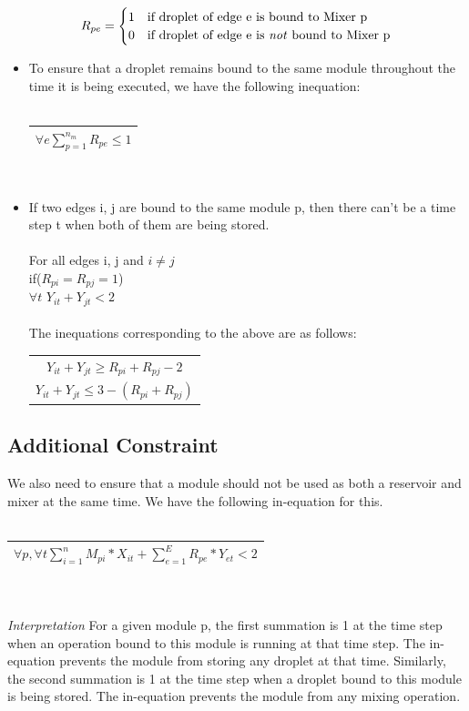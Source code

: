 \documentclass{article}
\newcommand{\eqn}[1]{
  \begin{tabular}{|c|}
  \hline
  $#1$\\
  \hline
  \end{tabular}
}
\begin{document}
\begin{equation*}
  R_{pe} = \begin{cases}
  1  &  \text{if droplet of edge e is bound to Mixer p} \\
  0  &  \text{if droplet of edge e is \emph{not} bound to Mixer p}
  \end{cases}
\end{equation*}

\begin{itemize}

\item To ensure that a droplet remains bound to the
same module throughout the time it is being executed, we have 
the following inequation:\\\\
\eqn{\forall e \sum\limits_{p=1}^{n_m}R_{pe} \leq 1}\\

\item If two edges i, j are bound to the same module p, then 
there can't be a time step t when both of them are being stored.\\
\\
For all edges i, j and $i\neq j$ \\if($R_{pi}=R_{pj}=1$)\\
\indent $\forall t$ $Y_{it}+ Y_{jt} < 2$\\
\\
The inequations corresponding to the above are as follows:\\ 
\begin{tabular}{|c|}
\hline
$Y_{it}+Y_{jt}\geq R_{pi}+R_{pj}-2$\\
$Y_{it}+Y_{jt}\leq 3-(R_{pi}+R_{pj})$\\
\hline
\end{tabular}
\end{itemize}
\subsection{Additional Constraint}
We also need to ensure that a module should not be used as both a reservoir and mixer at the same time. We have the following in-equation for this.\\
\\
\eqn{\forall p, \forall t \sum\limits_{i=1}^n M_{pi}*X_{it} + \sum\limits_{e=1}^E R_{pe}*Y_{et} < 2}\\\\

\emph{Interpretation} For a given module p, the first summation is 1 at the time step when an operation bound to this module is running at that time step. The in-equation prevents the module from storing any droplet at that time. Similarly, the second summation is 1 at the time step when a droplet bound to this module is being stored. The in-equation prevents the module from any mixing operation.
\end{document}
